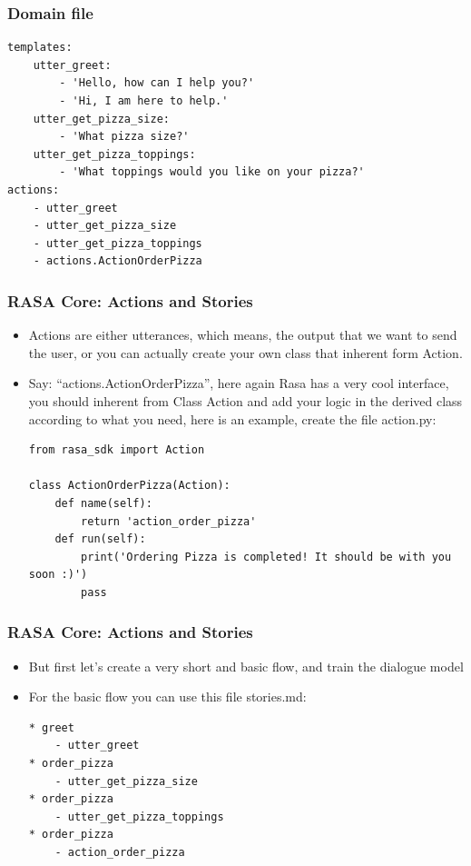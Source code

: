  \begin{frame}[fragile]\frametitle{Domain file}
\begin{lstlisting}
templates:
    utter_greet:
        - 'Hello, how can I help you?'
        - 'Hi, I am here to help.'
    utter_get_pizza_size:
        - 'What pizza size?'
    utter_get_pizza_toppings:
        - 'What toppings would you like on your pizza?'
actions:
    - utter_greet
    - utter_get_pizza_size
    - utter_get_pizza_toppings
    - actions.ActionOrderPizza
\end{lstlisting}
\end{frame}

 \begin{frame}[fragile]\frametitle{RASA Core: Actions and Stories}
\begin{itemize}
\item Actions are either utterances, which means, the output that we want to send the user, or you can actually create your own class that inherent form Action. 
\item Say: ``actions.ActionOrderPizza'', here again Rasa has a very cool interface, you should inherent from Class Action and add your logic in the derived class according to what you need, here is an example, create the file action.py:
\begin{lstlisting}
from rasa_sdk import Action

class ActionOrderPizza(Action):
    def name(self):
        return 'action_order_pizza'
    def run(self):
        print('Ordering Pizza is completed! It should be with you soon :)')
        pass
\end{lstlisting}
		
\end{itemize}

\end{frame}

 \begin{frame}[fragile]\frametitle{RASA Core: Actions and Stories}
\begin{itemize}
\item But first let's create a very short and basic flow, and train the dialogue model
\item For the basic flow you can use this file stories.md:
\begin{lstlisting}
* greet
    - utter_greet
* order_pizza
    - utter_get_pizza_size
* order_pizza
    - utter_get_pizza_toppings
* order_pizza
    - action_order_pizza
\end{lstlisting}
		
\end{itemize}

\end{frame}

